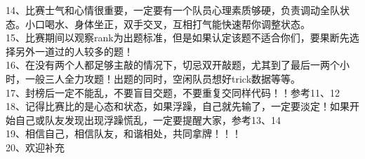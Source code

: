 14、比赛士气和心情很重要，一定要有一个队员心理素质够硬，负责调动全队状态。小口喝水、身体坐正，双手交叉，互相打气能快速帮你调整状态。 \\
15、比赛期间以观察rank为出题标准，但是如果认定该题不适合你们，要果断先选择另外一道过的人较多的题！ \\
16、在没有两个人都足够主敲的情况下，切忌双开敲题，尤其到了最后一两个小时，一般三人全力攻题！出题的同时，空闲队员想好trick数据等等。 \\
17、封榜后一定不能乱，不要盲目交题，不要重复交同样代码！！参考11、12 \\
18、记得比赛比的是心态和状态，如果浮躁，自己就先输了，一定要淡定！如果开始自己或队友发现出现浮躁慌乱，一定要提醒大家，参考13、14 \\
19、相信自己，相信队友，和谐相处，共同拿牌！！！ \\
20、欢迎补充~~ \\
